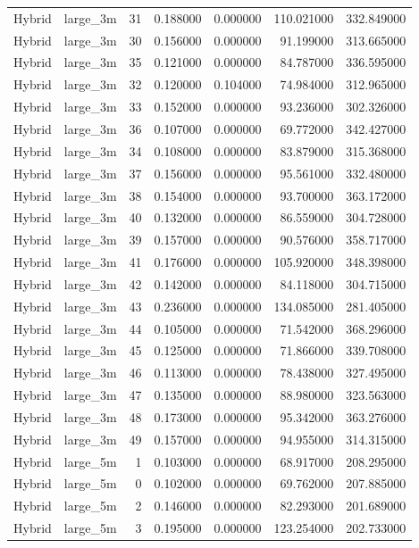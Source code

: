 \begin{tabular}{llrrrrr}
Hybrid & large_3m & 31 & 0.188000 & 0.000000 & 110.021000 & 332.849000 \\
Hybrid & large_3m & 30 & 0.156000 & 0.000000 & 91.199000 & 313.665000 \\
Hybrid & large_3m & 35 & 0.121000 & 0.000000 & 84.787000 & 336.595000 \\
Hybrid & large_3m & 32 & 0.120000 & 0.104000 & 74.984000 & 312.965000 \\
Hybrid & large_3m & 33 & 0.152000 & 0.000000 & 93.236000 & 302.326000 \\
Hybrid & large_3m & 36 & 0.107000 & 0.000000 & 69.772000 & 342.427000 \\
Hybrid & large_3m & 34 & 0.108000 & 0.000000 & 83.879000 & 315.368000 \\
Hybrid & large_3m & 37 & 0.156000 & 0.000000 & 95.561000 & 332.480000 \\
Hybrid & large_3m & 38 & 0.154000 & 0.000000 & 93.700000 & 363.172000 \\
Hybrid & large_3m & 40 & 0.132000 & 0.000000 & 86.559000 & 304.728000 \\
Hybrid & large_3m & 39 & 0.157000 & 0.000000 & 90.576000 & 358.717000 \\
Hybrid & large_3m & 41 & 0.176000 & 0.000000 & 105.920000 & 348.398000 \\
Hybrid & large_3m & 42 & 0.142000 & 0.000000 & 84.118000 & 304.715000 \\
Hybrid & large_3m & 43 & 0.236000 & 0.000000 & 134.085000 & 281.405000 \\
Hybrid & large_3m & 44 & 0.105000 & 0.000000 & 71.542000 & 368.296000 \\
Hybrid & large_3m & 45 & 0.125000 & 0.000000 & 71.866000 & 339.708000 \\
Hybrid & large_3m & 46 & 0.113000 & 0.000000 & 78.438000 & 327.495000 \\
Hybrid & large_3m & 47 & 0.135000 & 0.000000 & 88.980000 & 323.563000 \\
Hybrid & large_3m & 48 & 0.173000 & 0.000000 & 95.342000 & 363.276000 \\
Hybrid & large_3m & 49 & 0.157000 & 0.000000 & 94.955000 & 314.315000 \\
Hybrid & large_5m & 1 & 0.103000 & 0.000000 & 68.917000 & 208.295000 \\
Hybrid & large_5m & 0 & 0.102000 & 0.000000 & 69.762000 & 207.885000 \\
Hybrid & large_5m & 2 & 0.146000 & 0.000000 & 82.293000 & 201.689000 \\
Hybrid & large_5m & 3 & 0.195000 & 0.000000 & 123.254000 & 202.733000 \\

\end{tabular}

